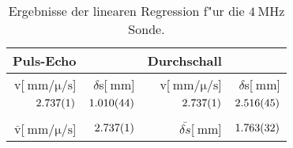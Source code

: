 \begin{table}[!h]
\begin{center}
\begin{tabular}{|r|r|r|r|}
\hline
Puls-Echo & & Durchschall & \\
\hline
\hline
v[$\SI{}{\milli\meter\per\micro\per\second}$] & $\delta$s[$\SI{}{\milli\meter}$] & v[$\SI{}{\milli\meter\per\micro\per\second}$]& $\delta$s[$\SI{}{\milli\meter}$]\\
\hline
$\SI{2.737 (1)}{}$ & $\SI{1.010 (44)}{}$ & $\SI{2.737 (1)}{}$ & $\SI{2.516 (45)}{}$\\
\hline
\hline
\\
$\bar{\mathrm{v}}$[$\SI{}{\milli\meter\per\micro\per\second}$] & $\SI{2.737 (1)}{}$ & $\bar{\delta s}$[$\SI{}{\milli\meter}$] & $\SI{1.763 (32)}{}$\\
\hline
\end{tabular}
\caption[]{Ergebnisse der linearen Regression f"ur die $\SI{4}{\mega\hertz}$ Sonde.}
\label{r4}
\end{center}
\end{table}